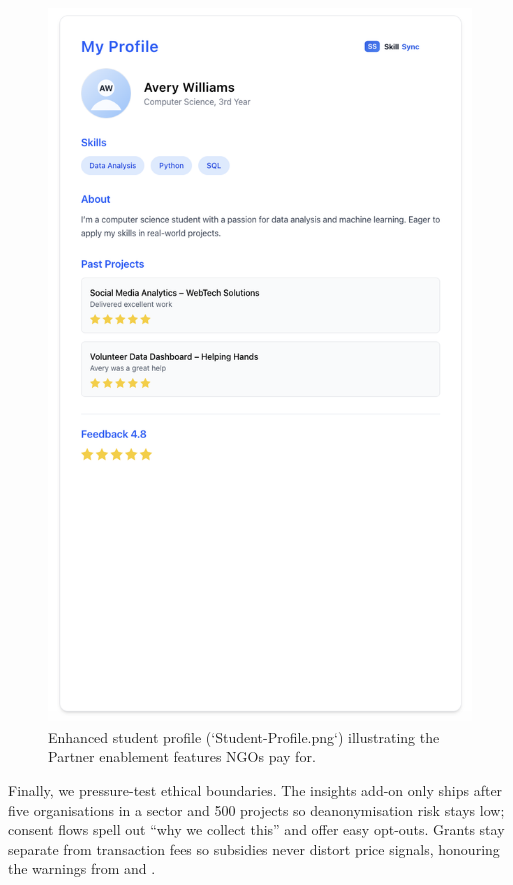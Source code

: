 \begin{figure}[h]
  \centering
  \includegraphics[width=0.7\linewidth]{figures/Student-Profile.png}
  \caption{Enhanced student profile (`Student-Profile.png`) illustrating the Partner enablement features NGOs pay for.}
  \label{fig:student-profile}
\end{figure}

Finally, we pressure-test ethical boundaries. The insights add-on only ships after five organisations in a sector and 500 projects so deanonymisation risk stays low; consent flows spell out ``why we collect this'' and offer easy opt-outs. Grants stay separate from transaction fees so subsidies never distort price signals, honouring the warnings from \citet{Zuboff2019} and \citet{Srnicek2017}.
